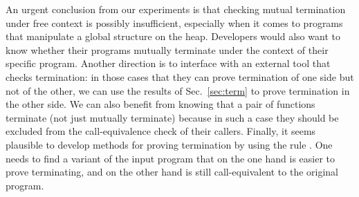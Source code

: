 An urgent conclusion from our experiments is that checking mutual termination under free context is possibly insufficient, especially when it comes to programs that manipulate a global structure on the heap. Developers would also want to know whether their programs mutually terminate under the context of their specific program.  Another direction is to interface  with an external tool that checks termination: in those cases that they can prove termination of one side but not of the other, we can use the results of Sec.~\ref{sec:term} to prove termination in the other side. We can also benefit from knowing that a pair of functions terminate (not just mutually terminate) because in such a case they should be excluded from the call-equivalence check of their callers.
%
Finally, it seems plausible to develop methods for proving termination by using the rule \mtermdp. One needs to find a variant of the input program that on the one hand is easier to prove terminating, and on the other hand is still call-equivalent to the original program.

